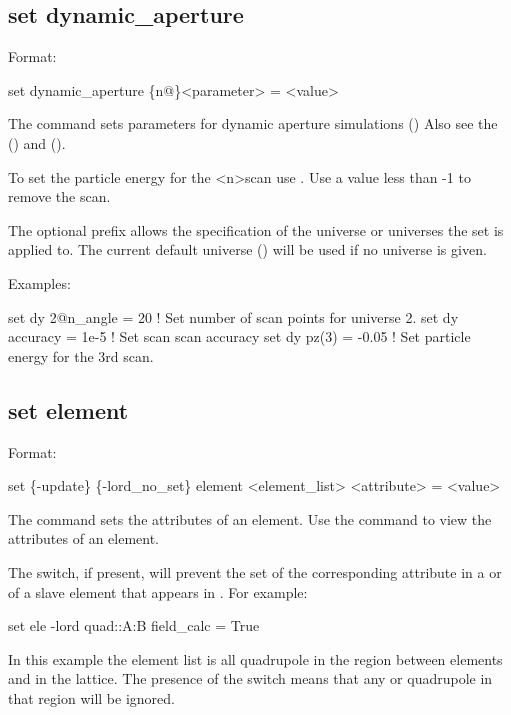 {{%

\subsection{set dynamic_aperture}
\label{s:set.da}

Format:
\begin{example}
  set dynamic_aperture \{n@\}<parameter> = <value>
\end{example}

The  command sets parameters for dynamic aperture simulations
() Also see the  () and
 ().

To set the particle energy for the <n>\Th scan use . Use a value less than -1 to remove
the scan.

The optional  prefix allows the specification of the universe or universes the set is applied
to. The current default universe () will be used if no universe is given.

Examples:
\begin{example}
  set dy 2@n_angle = 20   ! Set number of scan points for universe 2.
  set dy accuracy = 1e-5  ! Set scan scan accuracy
  set dy pz(3) = -0.05    ! Set particle energy for the 3rd scan.
\end{example}


\subsection{set element}
\label{s:set.element}

Format:
\begin{example}
  set \{-update\} \{-lord_no_set\} element <element_list> <attribute> = <value>
\end{example}

The  command sets the attributes of an element. Use the 
command to view the attributes of an element.

The  switch, if present, will prevent the set of the corresponding attribute in a
 or  of a slave element that appears in . For
example:
\begin{example}
  set ele -lord quad::A:B field_calc = True
\end{example}
In this example the element list is all quadrupole in the region between elements  and 
in the lattice. The presence of the  switch means that any  or
 quadrupole in that region will be ignored.

}}
